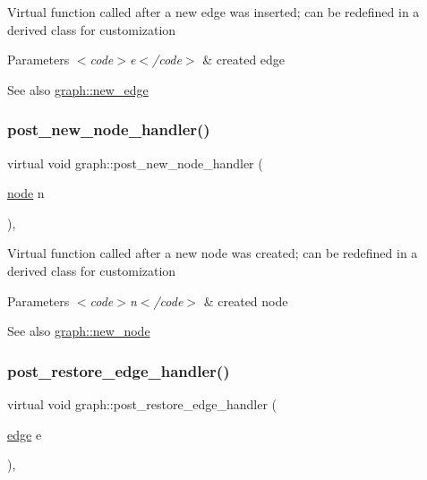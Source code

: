 Virtual function called after a new edge was inserted; can be redefined in a derived class for customization


\begin{DoxyParams}{Parameters}
{\em $<$code$>$e$<$/code$>$} & created edge \\
\hline
\end{DoxyParams}
\begin{DoxySeeAlso}{See also}
\mbox{\hyperlink{classgraph_a02a0c3a219f75d68caa408ef339d4a1c}{graph\+::new\+\_\+edge}} 
\end{DoxySeeAlso}
\mbox{\label{classgraph_a63b7354fbe3614748cc27340e99ff919}} 
\subsubsection{\texorpdfstring{post\+\_\+new\+\_\+node\+\_\+handler()}{post\_new\_node\_handler()}}
{\footnotesize\ttfamily virtual void graph\+::post\+\_\+new\+\_\+node\+\_\+handler (\begin{DoxyParamCaption}\item[{\mbox{\hyperlink{classnode}{node}}}]{n }\end{DoxyParamCaption})\hspace{0.3cm}{\ttfamily [inline]}, {\ttfamily [virtual]}}

Virtual function called after a new node was created; can be redefined in a derived class for customization


\begin{DoxyParams}{Parameters}
{\em $<$code$>$n$<$/code$>$} & created node \\
\hline
\end{DoxyParams}
\begin{DoxySeeAlso}{See also}
\mbox{\hyperlink{classgraph_ab9505335c20558319b6cce25aed23524}{graph\+::new\+\_\+node}} 
\end{DoxySeeAlso}
\mbox{\label{classgraph_a8c0f68bcd054fc2736716996bbf56472}} 
\subsubsection{\texorpdfstring{post\+\_\+restore\+\_\+edge\+\_\+handler()}{post\_restore\_edge\_handler()}}
{\footnotesize\ttfamily virtual void graph\+::post\+\_\+restore\+\_\+edge\+\_\+handler (\begin{DoxyParamCaption}\item[{\mbox{\hyperlink{classedge}{edge}}}]{e }\end{DoxyParamCaption})\hspace{0.3cm}{\ttfamily [inline]}, {\ttfamily [virtual]}}

